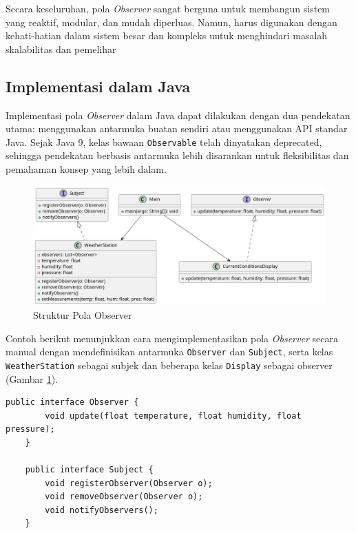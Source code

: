 Secara keseluruhan, pola \textit{Observer} sangat berguna untuk membangun sistem yang reaktif, modular, dan mudah diperluas. Namun, harus digunakan dengan kehati-hatian dalam sistem besar dan kompleks untuk menghindari masalah skalabilitas dan pemelihar


\subsection{Implementasi dalam Java}

Implementasi pola \textit{Observer} dalam Java dapat dilakukan dengan dua pendekatan utama: menggunakan antarmuka buatan sendiri atau menggunakan API standar Java. Sejak Java 9, kelas bawaan \texttt{Observable} telah dinyatakan deprecated, sehingga pendekatan berbasis antarmuka lebih disarankan untuk fleksibilitas dan pemahaman konsep yang lebih dalam.


\begin{figure}[h]
	\centering
	\includegraphics[width=\textwidth]{../figures/out/observer.png}
	\caption{Struktur Pola Observer}
	\label{fig:observer}
\end{figure}

Contoh berikut menunjukkan cara mengimplementasikan pola \textit{Observer} secara manual dengan mendefinisikan antarmuka \texttt{Observer} dan \texttt{Subject}, serta kelas \texttt{WeatherStation} sebagai subjek dan beberapa kelas \texttt{Display} sebagai observer (Gambar \ref{fig:observer}).

\begin{lstlisting}[style=JavaStyle, caption={Antarmuka Subject dan Observer}]
	public interface Observer {
		void update(float temperature, float humidity, float pressure);
	}
	
	public interface Subject {
		void registerObserver(Observer o);
		void removeObserver(Observer o);
		void notifyObservers();
	}
\end{lstlisting}

